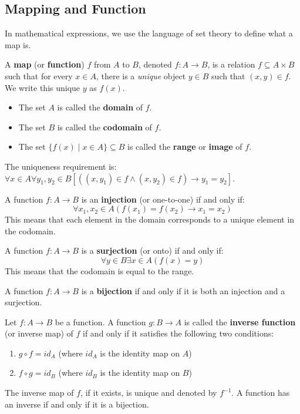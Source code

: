 \documentclass[oneside]{book}
\begin{document}
\subsection{Mapping and Function}
In mathematical expressions, we use the language of set theory to define what a map is.
\begin{definition}
A \textbf{map} (or \textbf{function}) $f$ from $A$ to $B$, denoted $f: A \to B$, is a relation $f \subseteq A \times B$ such that for every $x \in A$, there is a \emph{unique} object $y \in B$ such that $(x,y) \in f$. We write this unique $y$ as $f(x)$.
\begin{itemize}
    \item The set $A$ is called the \textbf{domain} of $f$.
    \item The set $B$ is called the \textbf{codomain} of $f$.
    \item The set $\{f(x) \mid x \in A\} \subseteq B$ is called the \textbf{range} or \textbf{image} of $f$.
\end{itemize}
The uniqueness requirement is: $\forall x \in A \forall y_1, y_2 \in B [((x,y_1) \in f \wedge (x,y_2) \in f) \to y_1 = y_2]$.
\end{definition}

\begin{definition}[Injection]
A function $f: A \to B$ is an \textbf{injection} (or one-to-one) if and only if:
$$ \forall x_1, x_2 \in A (f(x_1) = f(x_2) \to x_1 = x_2) $$
This means that each element in the domain corresponds to a unique element in the codomain.
\end{definition}

\begin{definition}[Surjection]
A function $f: A \to B$ is a \textbf{surjection} (or onto) if and only if:
$$ \forall y \in B \exists x \in A (f(x) = y) $$
This means that the codomain is equal to the range.
\end{definition}

\begin{definition}[Bijection]
A function $f: A \to B$ is a \textbf{bijection} if and only if it is both an injection and a surjection.
\end{definition}

\begin{definition}
Let $f: A \to B$ be a function. A function $g: B \to A$ is called the \textbf{inverse function} (or inverse map) of $f$ if and only if it satisfies the following two conditions:
\begin{enumerate}
    \item $g \circ f = id_A$ (where $id_A$ is the identity map on $A$)
    \item $f \circ g = id_B$ (where $id_B$ is the identity map on $B$)
\end{enumerate}
The inverse map of $f$, if it exists, is unique and denoted by $f^{-1}$. A function has an inverse if and only if it is a bijection.
\end{definition}
\end{document}
